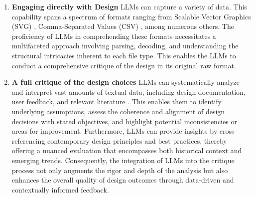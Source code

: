 \documentclass{article}
\begin{document}
\begin{enumerate}
    \item \textbf{Engaging directly with Design} 
    LLMs can capture a variety of data. This capability spans a spectrum of formats ranging from Scalable Vector Graphics (SVG) \cite{xu2024exploring}, Comma-Separated Values (CSV) \cite{vazquez2024llms}, among numerous others. The proficiency of LLMs in comprehending these formats necessitates a multifaceted approach involving parsing, decoding, and understanding the structural intricacies inherent to each file type. This enables the LLMs to conduct a comprehensive critique of the design in its original raw format.
    \item \textbf{A full critique of the design choices} 
    LLMs can systematically analyze and interpret vast amounts of textual data, including design documentation, user feedback, and relevant literature \cite{alabood2023systematic,luther2015structuring}. This enables them to identify underlying assumptions, assess the coherence and alignment of design decisions with stated objectives, and highlight potential inconsistencies or areas for improvement. Furthermore, LLMs can provide insights by cross-referencing contemporary design principles and best practices, thereby offering a nuanced evaluation that encompasses both historical context and emerging trends. Consequently, the integration of LLMs into the critique process not only augments the rigor and depth of the analysis but also enhances the overall quality of design outcomes through data-driven and contextually informed feedback.
    

\end{enumerate}
\end{document}
